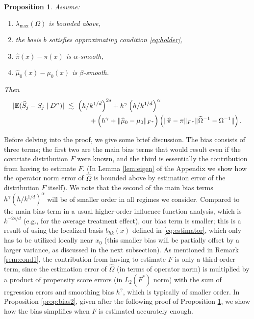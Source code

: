\documentclass[11pt,twoside]{article}
\newcommand{\Pb}{\mathbb{P}}
\newcommand{\E}{\mathbb{E}}
\newtheorem{proposition}{Proposition}
\theoremstyle{definition}
\theoremstyle{remark}
\begin{document}
\begin{proposition} \label{prop:bias}
Assume:
\begin{enumerate}
\item $\lambda_{\max}(\Omega)$ is bounded above, 
\item the basis $b$ satisfies approximating condition \eqref{eq:holder}, 
\item $\widehat\pi(x) - \pi(x)$ is $\alpha$-smooth, 
\item $\widehat\mu_0(x) - \mu_0(x)$ is $\beta$-smooth.
\end{enumerate}
Then
\begin{align*}
| \E(\widehat{S}_j - S_j \mid D^n) | & \ \lesssim \ \left( h/k^{1/d} \right)^{2s}  + h^\gamma  \left( h/k^{1/d} \right)^{\alpha} \\
& \hspace{.5in} + \Big( h^\gamma +\| \widehat\mu_0 - \mu_0 \|_{F^*} \Big) \left( \| \widehat\pi - \pi \|_{F^*}   \| \widehat\Omega^{-1}-\Omega^{-1} \|    \right) .
\end{align*}
\end{proposition}

\bigskip

Before delving into the proof, we give some brief discussion. The bias consists of three terms; the first two are the main bias terms that would result even if the covariate distribution $F$ were known, and the third is essentially the contribution from having to estimate $F$. (In Lemma \ref{lem:eigen} of the Appendix we show how the operator norm error of $\widehat\Omega$ is bounded above by estimation error of the distribution $F$ itself). We note that the second of the main bias terms $h^\gamma (h/k^{1/d})^\alpha$ will be of smaller order in all regimes we consider. Compared to the main bias term  in a usual higher-order influence function analysis, which is $k^{-2s/d}$ (e.g., for the average treatment effect), our bias term is smaller;  this is a result of  using the  localized basis $b_{hk}(x)$ defined in \eqref{eq:estimator}, which only has to be utilized locally near $x_0$ (this smaller bias will be partially offset by a larger variance, as discussed in the next subsection). As mentioned in Remark \ref{rem:cond1}, the contribution from having to estimate $F$ is only a third-order term, since the estimation error of $\widehat\Omega$ (in terms of  operator norm) is multiplied by a product  of propensity score errors  (in $L_2(F^*)$ norm) with the sum of regression errors and smoothing bias $h^\gamma$, which is typically of smaller order. In Proposition \ref{prop:bias2}, given after the following proof of Proposition \ref{prop:bias}, we show how the bias simplifies when $F$ is estimated accurately enough.    \\
\end{document}
